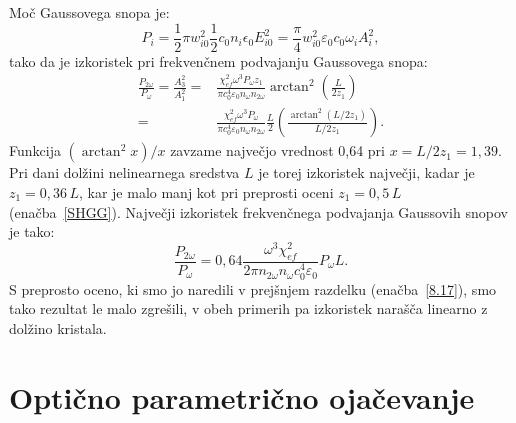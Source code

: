 Moč Gaussovega snopa je:
\begin{equation}
P_{i}=\frac{1}{2}\pi w_{i0}^{2} \frac{1}{2}c_0 n_i \epsilon_{0}E_{i0}^{2}=
\frac{\pi}{4}w_{i0}^{2}\varepsilon_0 c_0 \omega_{i} A_{i}^{2},
\label{8.26}
\end{equation}
tako da je izkoristek pri frekvenčnem podvajanju Gaussovega snopa:
\begin{equation}
\begin{aligned}
\frac{P_{2\omega}}{P_{\omega}}=\frac{A_3^2}{A_1^2}  = &
\frac{\chi_{ef}^2 \omega^3 P_\omega z_1}{\pi c_0^4 \varepsilon_0 n_\omega n_{2\omega}} 
\arctan^2 \left( \frac{L}{2z_1}\right) \\
 = &\frac{\chi_{ef}^2 \omega^3 P_\omega}{\pi c_0^4 \varepsilon_0 n_\omega n_{2\omega}} \frac{L}{2}
\left(\frac {\arctan^2 \left( L/2z_1\right)}{L/2z_1}\right)\!\!.
\label{8.27}
\end{aligned}
\end{equation}
Funkcija $(\arctan^{2}x)/x$ zavzame največjo vrednost 0,64 pri $x =L/2z_1=1,39$.
Pri dani dolžini nelinearnega sredstva $L$ je torej 
izkoristek največji, kadar je $z_{1}=0,36\,L$, kar je malo manj kot pri
preprosti oceni $z_{1}=0,5\,L$ (enačba~\ref{SHGG}). Največji izkoristek
frekvenčnega podvajanja Gaussovih snopov je tako:
\begin{equation}
\frac{P_{2\omega}}{P_{\omega}}
= 0,64 \frac{\omega^3 \chi_{ef}^2}{2\pi n_{2\omega} n_{\omega} c_0^4 \varepsilon_0 } P_\omega L.
\label{8.28}
\end{equation}
S preprosto oceno, ki smo jo naredili v prejšnjem razdelku (enačba~\ref{8.17}), smo tako 
rezultat le malo zgrešili, v obeh primerih pa izkoristek narašča linearno z dolžino kristala.

\section{Optično parametrično ojačevanje}

